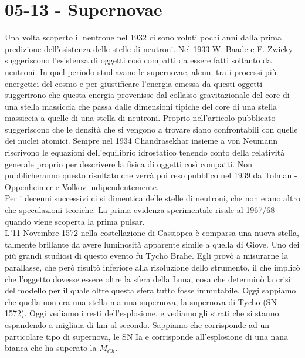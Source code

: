 \section*{05-13 - Supernovae}
Una volta scoperto il neutrone nel 1932 ci sono voluti pochi anni dalla prima predizione dell'esistenza delle stelle di neutroni. Nel 1933 W. Baade e F. Zwicky suggeriscono l'esistenza di oggetti così compatti da essere fatti soltanto da neutroni. In quel periodo studiavano le supernovae, alcuni tra i processi più energetici del cosmo e per giustificare l'energia emessa da questi oggetti suggerirono che questa energia provenisse dal collasso gravitazionale del core di una stella massiccia che passa dalle dimensioni tipiche del core di una stella massiccia a quelle di una stella di neutroni. Proprio nell'articolo pubblicato suggeriscono che le densità che si vengono a trovare siano confrontabili con quelle dei nuclei atomici. Sempre nel 1934 Chandrasekhar insieme a von Neumann riscrivono le equazioni dell'equilibrio idrostatico tenendo conto della relatività generale proprio per descrivere la fisica di oggetti così compatti. Non pubblicheranno questo risultato che verrà poi reso pubblico nel 1939 da Tolman - Oppenheimer e Volkov indipendentemente.\\
Per i decenni successivi ci si dimentica delle stelle di neutroni, che non erano altro che speculazioni teoriche. La prima evidenza sperimentale risale al 1967/68 quando viene scoperta la prima pulsar.\\
L'11 Novembre 1572 nella costellazione di Cassiopea è comparsa una nuova stella, talmente brillante da avere luminosità apparente simile a quella di Giove. Uno dei più grandi studiosi di questo evento fu Tycho Brahe. Egli provò a misurarne la parallasse, che però risultò inferiore alla risoluzione dello strumento, il che implicò che l'oggetto dovesse essere oltre la sfera della Luna, cosa che determinò la crisi del modello per il quale oltre questa sfera tutto fosse immutabile. Oggi sappiamo che quella non era una stella ma una supernova, la supernova di Tycho (SN 1572). Oggi vediamo i resti dell'esplosione, e vediamo gli strati che si stanno espandendo a migliaia di km al secondo. Sappiamo che corrisponde ad un particolare tipo di supernova, le SN Ia e corrisponde all'esplosione di una nana bianca che ha superato la $M_{Ch}$.
